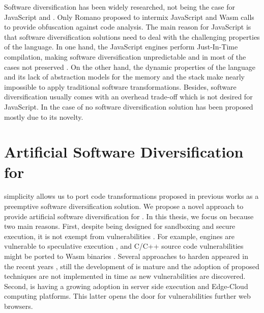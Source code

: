 Software diversification has been widely researched, not being the case for JavaScript and \wasm.
Only Romano \etal \cite{wobfuscator} proposed to intermix JavaScript and Wasm calls to provide obfuscation against code analysis. 
The main reason for JavaScript is that software diversification solutions need to deal with the challenging properties of the language.
In one hand, the JavaScript engines perform Just-In-Time compilation, making software diversification unpredictable and in most of the cases not preserved \cite{STRAC}.
On the other hand, the dynamic properties of the language and its lack of abstraction models for the memory and the stack make nearly impossible to apply traditional software transformations.
Besides, software diversification usually comes with an overhead trade-off which is not desired for JavaScript. 
In the case of \wasm no software diversification solution has been proposed mostly due to its novelty.



\section{Artificial Software Diversification for \wasm}

\wasm simplicity allows us to port code transformations proposed in previous works as a preemptive software diversification solution.
We propose a novel approach to provide artificial software diversification for \wasm.
In this thesis, we focus on \wasm because two main reasons. First,
despite being designed for sandboxing and secure execution, it is not exempt from vulnerabilities \cite{WebAssemblySecurity}.
For example, \wasm engines are vulnerable to speculative execution \cite{Narayan2021Swivel}, and C/C++ source code vulnerabilities might be ported to Wasm binaries \cite{DeRoover2022}.  
Several approaches to harden \wasm appeared in the recent years \citationneeded, still the development of \wasm is mature and the adoption of proposed techniques are not implemented in time as new vulnerabilities are discovered.
Second, \wasm is having a growing adoption in server side execution and Edge-Cloud computing platforms.
This latter opens the door for vulnerabilities further web browsers.




